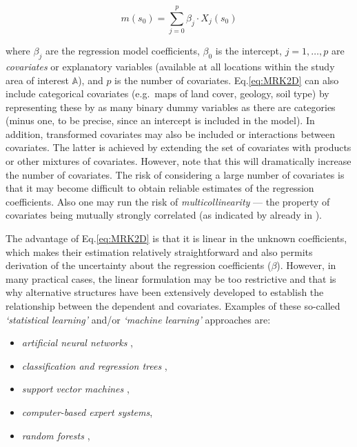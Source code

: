 \documentclass[graybox,natbib,nospthms,UStrade]{svmono}
\begin{document}
\begin{equation}
m({s}_0 ) = \sum\limits_{j = 0}^p { \beta _j \cdot X_j ({s}_0 )}
\label{eq:MRK2D}
\end{equation}

where \(\beta _j\) are the regression model coefficients, \(\beta _0\) is
the intercept, \(j=1,\ldots,p\) are \emph{covariates} or explanatory variables
(available at all locations within the study area of interest
\(\mathbb{A}\)), and \(p\) is the number of covariates. Eq.\eqref{eq:MRK2D}
can also include categorical covariates (e.g.~maps of land cover,
geology, soil type) by representing these by as many binary dummy
variables as there are categories (minus one, to be precise, since an
intercept is included in the model). In addition, transformed covariates
may also be included or interactions between covariates. The latter is
achieved by extending the set of covariates with products or other
mixtures of covariates. However, note that this will dramatically
increase the number of covariates. The risk of considering a large number
of covariates is that it may become difficult to obtain reliable
estimates of the regression coefficients. Also one may run the
risk of \emph{multicollinearity} --- the property of covariates being mutually
strongly correlated (as indicated by \citet{Jenny1968} already in
\citeyearpar{Jenny1968}).

The advantage of Eq.\eqref{eq:MRK2D} is that it is linear in the unknown
coefficients, which makes their estimation relatively straightforward
and also permits derivation of the uncertainty about the regression
coefficients (\(\beta\)). However, in many practical cases, the linear
formulation may be too restrictive and that is why alternative
structures have been extensively developed to establish the relationship
between the dependent and covariates. Examples of these so-called
\emph{`statistical learning'} and/or \emph{`machine learning'} approaches are:

\begin{itemize}
\item
  \emph{artificial neural networks} \citep{yegnanarayana2004artificial},
\item
  \emph{classification and regression trees} \citep{breiman1993classification},
\item
  \emph{support vector machines} \citep{hearst1998support},
\item
  \emph{computer-based expert systems},
\item
  \emph{random forests} \citep{breiman2001random, meinshausen2006quantile},
\end{itemize}
\end{document}
